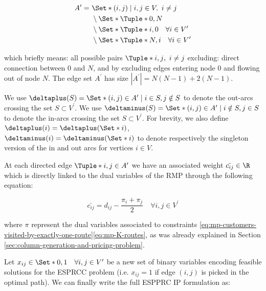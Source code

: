 \begin{equation}
	\begin{aligned}
		A^\prime = \  & \Set*{(i, j) \mid i, j \in V,\ i \ne j}                       \\
		              & \setminus \Set*{ \Tuple*{0, N} }                              \\
		              & \setminus \Set*{ \Tuple*{i, 0} \quad \forall i \in V^\prime } \\
		              & \setminus \Set*{ \Tuple*{N, i} \quad \forall i \in V^\prime } \\
	\end{aligned}
\end{equation}

which briefly means: all possible pairs $\Tuple*{i, j},\ i \ne j$ excluding: direct connection between $0$ and $N$, and by excluding edges entering node $0$ and flowing out of node $N$.
The edge set $A^\prime$ has size $|A^\prime| = N(N - 1) + 2(N - 1)$.

We use $\deltaplus(S) = \Set*{(i, j) \in A^\prime \mid i \in S, j \notin S}$ to denote the out-arcs crossing the set $S \subset V^\prime$.
We use $\deltaminus(S) = \Set*{(i, j) \in A^\prime \mid i \notin S, j \in S}$ to denote the in-arcs crossing the set $S \subset V^\prime$.
For brevity, we also define $\deltaplus(i) = \deltaplus(\Set*{i})$, $\deltaminus(i) = \deltaminus(\Set*{i})$
to denote respectively the singleton version of the in and out arcs for vertices $i \in V$.

At each directed edge $\Tuple*{i, j} \in A^\prime$ we have an associated weight $\bar{c_{ij}} \in \R$ which is directly linked to the dual variables of the RMP through the following equation:

\begin{equation}
	\bar{c_{ij}} = d_{ij} - \frac{\pi_i + \pi_j}{2} \quad \forall i, j \in V^\prime
\end{equation}

where $\pi$ represent the dual variables associated to constraints \eqref{eq:mp-customers-visited-by-exactly-one-route}\eqref{eq:mp-K-routes},
as was already explained in Section \ref{sec:column-generation-and-pricing-problem}.

Let $x_{ij} \in \Set*{0, 1} \quad \forall i, j \in V^\prime$ be a new set of binary variables
encoding feasible solutions for the ESPRCC problem (i.e. $x_{ij} = 1$ if edge $(i, j)$ is picked in the optimal path).
We can finally write the full ESPPRC IP formulation as:

